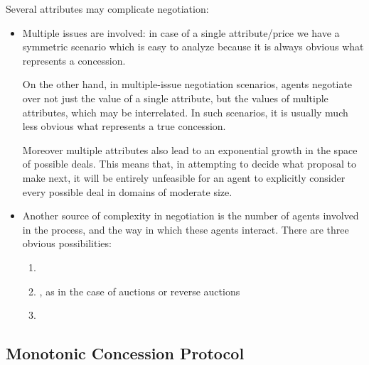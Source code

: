 Several attributes may complicate negotiation:
\begin{itemize}
\item Multiple issues are involved: in case of a single attribute/price we have a symmetric scenario which is easy to analyze because it is always obvious what represents a concession.

On the other hand, in multiple-issue negotiation scenarios, agents negotiate over not just the value of a single attribute, but the values of multiple attributes, which may be interrelated. In such scenarios, it is usually much less obvious what represents a true concession.

Moreover multiple attributes also lead to an exponential growth in the space of possible deals. This means that, in attempting to decide what proposal to make next, it will be entirely unfeasible for an agent to explicitly consider every possible deal in domains of moderate size.
\item Another source of complexity in negotiation is the number of agents involved in the process, and the way in which these agents interact. There are three obvious possibilities:
\begin{enumerate}
\item {}
\item {}, as in the case of auctions or reverse auctions
\item {}
\end{enumerate}
\end{itemize}
\subsection{Monotonic Concession Protocol}
